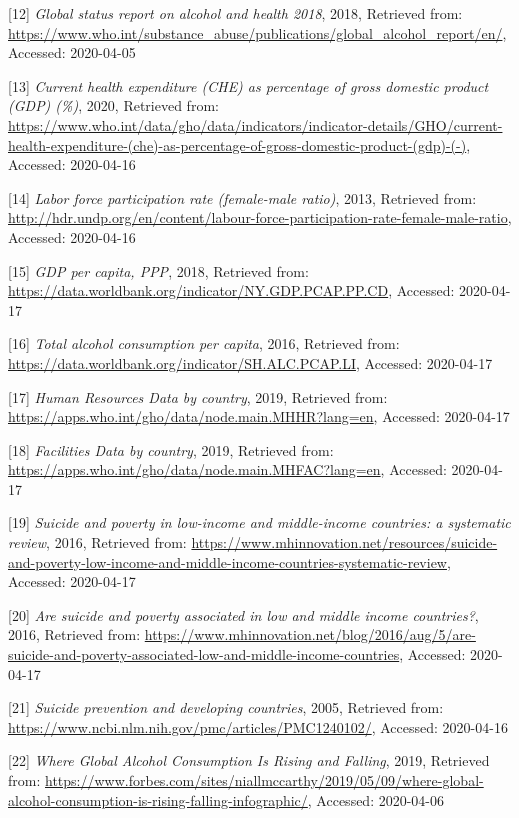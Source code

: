 \documentclass[]{article}
\begin{document}
{[}12{]} \emph{Global status report on alcohol and health 2018}, 2018,
Retrieved from:
\url{https://www.who.int/substance_abuse/publications/global_alcohol_report/en/},
Accessed: 2020-04-05

{[}13{]} \emph{Current health expenditure (CHE) as percentage of gross
domestic product (GDP) (\%)}, 2020, Retrieved from:
\url{https://www.who.int/data/gho/data/indicators/indicator-details/GHO/current-health-expenditure-(che)-as-percentage-of-gross-domestic-product-(gdp)-(-)},
Accessed: 2020-04-16

{[}14{]} \emph{Labor force participation rate (female-male ratio)},
2013, Retrieved from:
\url{http://hdr.undp.org/en/content/labour-force-participation-rate-female-male-ratio},
Accessed: 2020-04-16

{[}15{]} \emph{GDP per capita, PPP}, 2018, Retrieved from:
\url{https://data.worldbank.org/indicator/NY.GDP.PCAP.PP.CD}, Accessed:
2020-04-17

{[}16{]} \emph{Total alcohol consumption per capita}, 2016, Retrieved
from: \url{https://data.worldbank.org/indicator/SH.ALC.PCAP.LI},
Accessed: 2020-04-17

{[}17{]} \emph{Human Resources Data by country}, 2019, Retrieved from:
\url{https://apps.who.int/gho/data/node.main.MHHR?lang=en}, Accessed:
2020-04-17

{[}18{]} \emph{Facilities Data by country}, 2019, Retrieved from:
\url{https://apps.who.int/gho/data/node.main.MHFAC?lang=en}, Accessed:
2020-04-17

{[}19{]} \emph{Suicide and poverty in low-income and middle-income
countries: a systematic review}, 2016, Retrieved from:
\url{https://www.mhinnovation.net/resources/suicide-and-poverty-low-income-and-middle-income-countries-systematic-review},
Accessed: 2020-04-17

{[}20{]} \emph{Are suicide and poverty associated in low and middle
income countries?}, 2016, Retrieved from:
\url{https://www.mhinnovation.net/blog/2016/aug/5/are-suicide-and-poverty-associated-low-and-middle-income-countries},
Accessed: 2020-04-17

{[}21{]} \emph{Suicide prevention and developing countries}, 2005,
Retrieved from:
\url{https://www.ncbi.nlm.nih.gov/pmc/articles/PMC1240102/}, Accessed:
2020-04-16

{[}22{]} \emph{Where Global Alcohol Consumption Is Rising and Falling},
2019, Retrieved from:
\url{https://www.forbes.com/sites/niallmccarthy/2019/05/09/where-global-alcohol-consumption-is-rising-falling-infographic/},
Accessed: 2020-04-06
\end{document}

